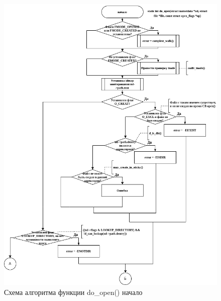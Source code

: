 \begin{figure}[H]
	\centering
	\includegraphics[scale=0.6]{assets/lab06-do_open.drawio.png}
	\caption{Схема алгоритма функции do\_open() начало}
\end{figure}

